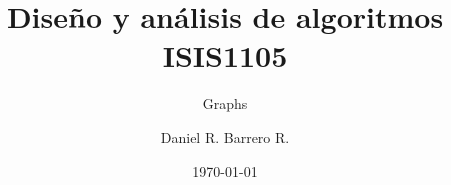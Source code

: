 \title{Diseño y análisis de algoritmos\\ ISIS1105}
\subtitle{Graphs}
\author{Daniel R. Barrero R.}
\date{\today}


